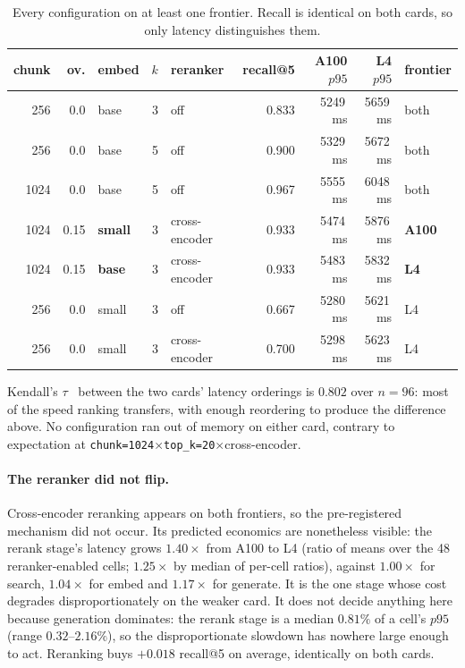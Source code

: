 \begin{table}[htbp]
\centering\footnotesize
\caption{Every configuration on at least one frontier. Recall is identical on
both cards, so only latency distinguishes them.}
\label{tab:frontier}
\begin{tabular}{@{}rrlrlrrrl@{}}
\toprule
chunk & ov. & embed & $k$ & reranker & recall@5 & A100 $p95$ & L4 $p95$ & frontier \\
\midrule
256  & 0.0  & base           & 3 & off           & 0.833 & 5249\,ms & 5659\,ms & both \\
256  & 0.0  & base           & 5 & off           & 0.900 & 5329\,ms & 5672\,ms & both \\
1024 & 0.0  & base           & 5 & off           & 0.967 & 5555\,ms & 6048\,ms & both \\
1024 & 0.15 & \textbf{small} & 3 & cross-encoder & 0.933 & 5474\,ms & 5876\,ms & \textbf{A100} \\
1024 & 0.15 & \textbf{base}  & 3 & cross-encoder & 0.933 & 5483\,ms & 5832\,ms & \textbf{L4} \\
256  & 0.0  & small          & 3 & off           & 0.667 & 5280\,ms & 5621\,ms & L4 \\
256  & 0.0  & small          & 3 & cross-encoder & 0.700 & 5298\,ms & 5623\,ms & L4 \\
\bottomrule
\end{tabular}
\end{table}

Kendall's $\tau$~\citep{kendall1938} between the two cards' latency orderings is
$0.802$ over $n=96$: most of the speed ranking transfers, with enough reordering
to produce the difference above. No configuration ran out of memory on either
card, contrary to expectation at
\texttt{chunk=1024}$\times$\texttt{top\_k=20}$\times$cross-encoder.

\paragraph{The reranker did not flip.} Cross-encoder reranking appears on both
frontiers, so the pre-registered mechanism did not occur. Its predicted
economics are nonetheless visible: the rerank stage's latency grows $1.40\times$
from A100 to L4 (ratio of means over the 48 reranker-enabled cells; $1.25\times$
by median of per-cell ratios), against $1.00\times$ for search, $1.04\times$ for
embed and $1.17\times$ for generate. It is the one stage whose cost degrades
disproportionately on the weaker card. It does not decide anything here because
generation dominates: the rerank stage is a median $0.81\%$ of a cell's $p95$
(range $0.32$--$2.16\%$), so the disproportionate slowdown has nowhere large
enough to act. Reranking buys $+0.018$ recall@5 on average, identically on both
cards.

